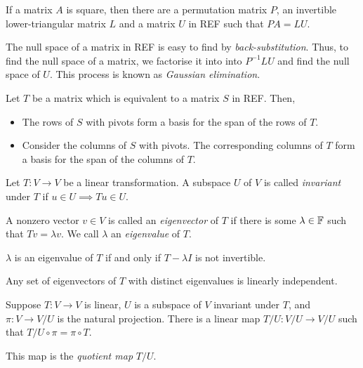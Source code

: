 \begin{prop}[$LU$ Factorisation]
    If a matrix $A$ is square, then there are a permutation matrix $P$, an
    invertible lower-triangular matrix $L$ and a matrix $U$ in REF
    such that $PA=LU$.
\end{prop}
\begin{rem}
    The null space of a matrix in REF is easy to find by
    \emph{back-substitution}.
    Thus, to find the null space of a matrix, we factorise it into into
    $P^{-1}LU$ and find the null space of $U$. This process is known as
    \emph{Gaussian elimination}.
\end{rem}
\begin{prop}
  Let $T$ be a matrix which is equivalent to a matrix $S$ in REF\@. Then,
  \begin{itemize}
    \item The rows of $S$ with pivots form a basis for the span of the rows of $T$.
    \item Consider the columns of $S$ with pivots. The corresponding columns of
      $T$ form a basis for the span of the columns of $T$.
  \end{itemize}
\end{prop}
\begin{defn}
    Let $T:V\to V$ be a linear transformation. A subspace $U$ of $V$ is called
    \emph{invariant} under $T$ if $u\in U\implies Tu\in U$.
\end{defn}
\begin{defn}
  A nonzero vector $v\in V$ is called an \emph{eigenvector} of $T$ if there is
  some $\lambda\in\mathbb{F}$ such that $Tv=\lambda v$. We call $\lambda$ an
  \emph{eigenvalue} of $T$.
\end{defn}
\begin{prop}
  $\lambda$ is an eigenvalue of $T$ if and only if $T-\lambda I$ is not
  invertible.
\end{prop}
\begin{prop}
  Any set of eigenvectors of $T$ with distinct eigenvalues is linearly
  independent.
\end{prop}
\begin{prop}
  Suppose $T:V\to V$ is linear, $U$ is a subspace of $V$ invariant under
  $T$, and $\pi:V\to V/U$ is the natural projection. There is a linear map $T/U:V/U\to
  V/U$ such that $T/U\circ\pi=\pi\circ T$.
\end{prop}
\begin{defn}
    This map is the \emph{quotient map} $T/U$.
\end{defn}

